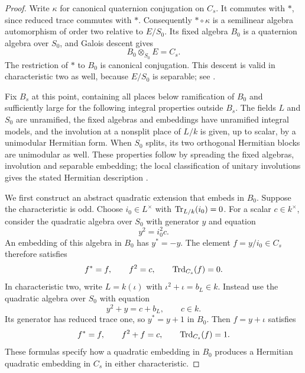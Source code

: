 \begin{proof}
Write $\kappa$ for canonical quaternion conjugation on $C_s$.
It commutes with $*$, since reduced trace commutes with $*$.
Consequently $*\circ\kappa$ is a semilinear algebra automorphism
of order two relative to $E/S_0$.  Its fixed algebra $B_0$ is a
quaternion algebra over $S_0$, and Galois descent gives
\[
 B_0\otimes_{S_0}E=C_s.
\]
The restriction of $*$ to $B_0$ is canonical conjugation.
This descent is valid in characteristic two as well, because
$E/S_0$ is separable; see \cite{KMRT}.

Fix $B_s$ at this point, containing all places below ramification
of $B_0$ and sufficiently large for the following integral
properties outside $B_s$.  The fields $L$ and $S_0$ are
unramified, the fixed algebras and embeddings have unramified
integral models, and the involution at a nonsplit place of $L/k$
is given, up to scalar, by a unimodular Hermitian form.
When $S_0$ splits, its two orthogonal Hermitian blocks are
unimodular as well.  These properties follow by spreading the
fixed algebras, involution and separable embedding; the local
classification of unitary involutions gives the stated Hermitian
description \cite{KMRT}.

We first construct an abstract quadratic extension that embeds in
$B_0$.  Suppose the characteristic is odd.  Choose
$i_0\in L^\times$ with $\operatorname{Tr}_{L/k}(i_0)=0$.  For a scalar
$c\in k^\times$, consider the quadratic algebra over $S_0$ with
generator $y$ and equation
\[
 y^2=i_0^2c.
\]
An embedding of this algebra in $B_0$ has $y^*=-y$.  The element
$f=y/i_0\in C_s$ therefore satisfies
\[
 f^*=f,\qquad f^2=c,\qquad\operatorname{Trd}_{C_s}(f)=0.
\]
In characteristic two, write
$L=k(\iota)$ with $\iota^2+\iota=b_L\in k$.
Instead use the quadratic algebra over $S_0$ with equation
\[
 y^2+y=c+b_L,\qquad c\in k.
\]
Its generator has reduced trace one, so $y^*=y+1$ in $B_0$.
Then $f=y+\iota$ satisfies
\[
 f^*=f,\qquad f^2+f=c,\qquad\operatorname{Trd}_{C_s}(f)=1.
\]
These formulas specify how a quadratic embedding in $B_0$ produces
a Hermitian quadratic embedding in $C_s$ in either characteristic.


\end{proof}
